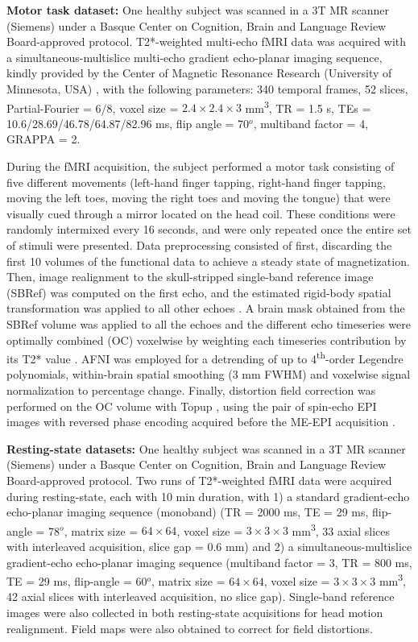 \textbf{Motor task dataset:} One healthy subject was scanned in a 3T MR scanner
(Siemens) under a Basque Center on Cognition, Brain and Language Review
Board-approved protocol. T2*-weighted multi-echo fMRI data was acquired with a
simultaneous-multislice multi-echo gradient echo-planar imaging sequence, kindly
provided by the Center of Magnetic Resonance Research (University of Minnesota,
USA) \citep{Feinberg_2010,Moeller_2010,Setsompop_2011}, with the following
parameters: 340 temporal frames, 52 slices, Partial-Fourier =
6/8, voxel size = $2.4\times2.4\times3$ mm\textsuperscript{3}, TR = 1.5 s, TEs =
10.6/28.69/46.78/64.87/82.96 ms, flip angle = 70\(^o\), multiband factor = 4,
GRAPPA = 2.

During the fMRI acquisition, the subject performed a motor task consisting of
five different movements (left-hand finger tapping, right-hand finger tapping,
moving the left toes, moving the right toes and moving the tongue) that were
visually cued through a mirror located on the head coil. These conditions were
randomly intermixed every 16 seconds, and were only repeated once the entire set
of stimuli were presented. Data preprocessing consisted of first, discarding the
first 10 volumes of the functional data to achieve a steady state of
magnetization. Then, image realignment to the skull-stripped single-band
reference image (SBRef) was computed on the first echo, and the estimated
rigid-body spatial transformation was applied to all other echoes
\citep{Jenkinson2012FSL,Jenkinson_2001}. A brain mask obtained from the SBRef
volume was applied to all the echoes and the different echo timeseries were
optimally combined (OC) voxelwise by weighting each timeseries contribution by
its T2* value \citep{Posse_1999}. AFNI \citep{Cox1996AFNISoftwareAnalysis} was
employed for a detrending of up to 4\textsuperscript{th}-order Legendre
polynomials, within-brain spatial smoothing (3 mm FWHM) and voxelwise signal
normalization to percentage change. Finally, distortion field correction was
performed on the OC volume with Topup \citep{Andersson_2003}, using the pair of
spin-echo EPI images with reversed phase encoding acquired before the ME-EPI
acquisition \citep{Glasser_2016}.

\textbf{Resting-state datasets:} One healthy subject was scanned in a 3T MR
scanner (Siemens) under a Basque Center on Cognition, Brain and Language Review
Board-approved protocol. Two runs of T2*-weighted fMRI data were acquired during
resting-state, each with 10 min duration, with 1) a standard gradient-echo
echo-planar imaging sequence (monoband) (TR = 2000 ms, TE = 29 ms, flip-angle =
78\(^o\), matrix size = $64\times64$, voxel size = $3\times3\times3$
mm\textsuperscript{3}, 33 axial slices with interleaved acquisition, slice gap =
0.6 mm) and 2) a  simultaneous-multislice gradient-echo echo-planar imaging
sequence (multiband factor = 3, TR = 800 ms, TE = 29 ms, flip-angle = 60\(^o\),
matrix size = $64\times64$, voxel size = $3\times3\times3$
mm\textsuperscript{3}, 42 axial slices with interleaved acquisition, no slice
gap). Single-band reference images were also collected in both resting-state
acquisitions for head motion realignment. Field maps were also obtained to
correct for field distortions.


